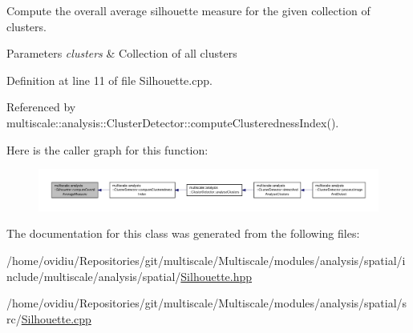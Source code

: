 Compute the overall average silhouette measure for the given collection of clusters. 


\begin{DoxyParams}{Parameters}
{\em clusters} & Collection of all clusters \\
\hline
\end{DoxyParams}


Definition at line 11 of file Silhouette.\-cpp.



Referenced by multiscale\-::analysis\-::\-Cluster\-Detector\-::compute\-Clusteredness\-Index().



Here is the caller graph for this function\-:
\nopagebreak
\begin{figure}[H]
\begin{center}
\leavevmode
\includegraphics[width=350pt]{classmultiscale_1_1analysis_1_1Silhouette_a21fab3292947caed2dbab0da542ac24c_icgraph}
\end{center}
\end{figure}




The documentation for this class was generated from the following files\-:\begin{DoxyCompactItemize}
\item 
/home/ovidiu/\-Repositories/git/multiscale/\-Multiscale/modules/analysis/spatial/include/multiscale/analysis/spatial/\hyperlink{Silhouette_8hpp}{Silhouette.\-hpp}\item 
/home/ovidiu/\-Repositories/git/multiscale/\-Multiscale/modules/analysis/spatial/src/\hyperlink{Silhouette_8cpp}{Silhouette.\-cpp}\end{DoxyCompactItemize}
